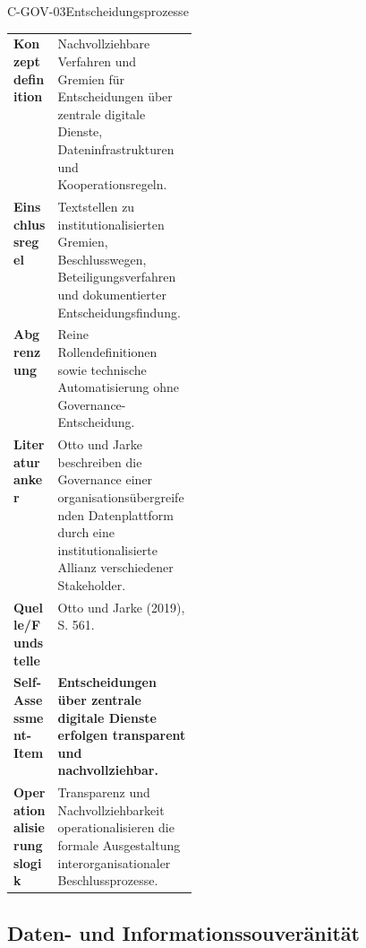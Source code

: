 \documentclass[10pt,a4paper]{article}
\begin{document}
\begin{codecard}{C-GOV-03}{Entscheidungsprozesse}
\begin{tabularx}{\linewidth}{@{}>{\RaggedRight\arraybackslash\bfseries\color{DeepNavy}}p{0.245\linewidth}>{\RaggedRight\arraybackslash}X@{}}
Konzeptdefinition & Nachvollziehbare Verfahren und Gremien für Entscheidungen über zentrale digitale Dienste, Dateninfrastrukturen und Kooperationsregeln. \\
\arrayrulecolor{SoftRule}\hline
Einschlussregel & Textstellen zu institutionalisierten Gremien, Beschlusswegen, Beteiligungsverfahren und dokumentierter Entscheidungsfindung. \\
\arrayrulecolor{SoftRule}\hline
Abgrenzung & Reine Rollendefinitionen sowie technische Automatisierung ohne Governance-Entscheidung. \\
\arrayrulecolor{SoftRule}\hline
Literaturanker & Otto und Jarke beschreiben die Governance einer organisationsübergreifenden Datenplattform durch eine institutionalisierte Allianz verschiedener Stakeholder. \\
\arrayrulecolor{SoftRule}\hline
Quelle/Fundstelle & Otto und Jarke (2019), S. 561. \\
\arrayrulecolor{SoftRule}\hline
Self-Assessment-Item & \textbf{Entscheidungen über zentrale digitale Dienste erfolgen transparent und nachvollziehbar.} \\
\arrayrulecolor{SoftRule}\hline
Operationalisierungslogik & Transparenz und Nachvollziehbarkeit operationalisieren die formale Ausgestaltung interorganisationaler Beschlussprozesse. \\
\end{tabularx}
\end{codecard}

\subsection{Daten- und Informationssouveränität}
\label{supp:dimension-2}
\end{document}
